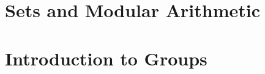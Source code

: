 \documentclass[10pt,oneside]{book}
\begin{document}

{\let\clearpage\relax \tableofcontents} 
\newpage


\chapter{Sets and Modular Arithmetic}


\chapter{Introduction to Groups}
\end{document}
